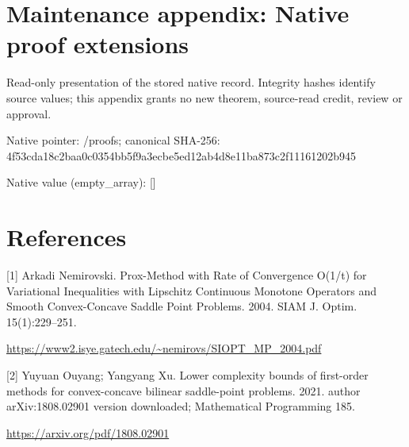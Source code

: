 \documentclass[10pt,a4paper]{article}
\begin{document}
\section{Maintenance appendix: Native proof extensions}


Read-only presentation of the stored native record. Integrity hashes identify source values; this appendix grants no new theorem, source-read credit, review or approval.



Native pointer: /proofs; canonical SHA-256: 4f53cda18c2baa0c0354bb5f\allowbreak{}9a3ecbe5ed12ab4d8e11ba87\allowbreak{}3c2f11161202b945



Native value (empty\_array): []



\section{References}


[1] Arkadi Nemirovski. Prox-Method with Rate of Convergence O(1/t) for Variational Inequalities with Lipschitz Continuous Monotone Operators and Smooth Convex-Concave Saddle Point Problems. 2004. SIAM J. Optim. 15(1):229--251.



\url{https://www2.isye.gatech.edu/~nemirovs/SIOPT_MP_2004.pdf}



[2] Yuyuan Ouyang; Yangyang Xu. Lower complexity bounds of first-order methods for convex-concave bilinear saddle-point problems. 2021. author arXiv:1808.02901 version downloaded; Mathematical Programming 185.



\url{https://arxiv.org/pdf/1808.02901}
\end{document}
